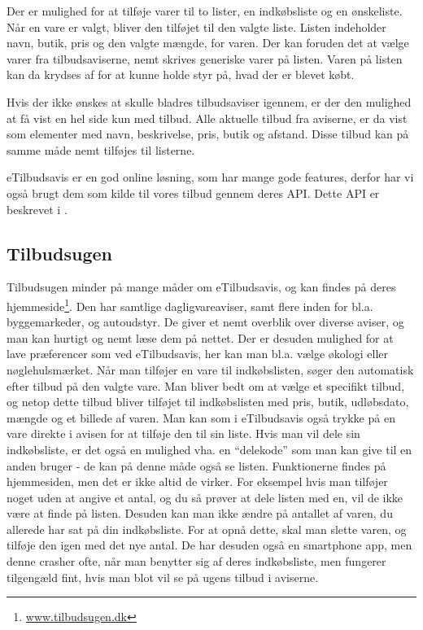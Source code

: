Der er mulighed for at tilføje varer til to lister, en indkøbsliste og en ønskeliste.
Når en vare er valgt, bliver den tilføjet til den valgte liste.
Listen indeholder navn, butik, pris og den valgte mængde, for varen.
Der kan foruden det at vælge varer fra tilbudsaviserne, nemt skrives generiske varer på listen. Varen på listen kan da krydses af for at kunne holde styr på, hvad der er blevet købt.

Hvis der ikke ønskes at skulle bladres tilbudsaviser igennem, er der den mulighed at få vist en hel side kun med tilbud.
Alle aktuelle tilbud fra aviserne, er da vist som elementer med navn, beskrivelse, pris, butik og afstand. Disse tilbud kan på samme måde nemt tilføjes til listerne.

eTilbudsavis er en god online løsning, som har mange gode features, derfor har vi også brugt dem som kilde til vores tilbud gennem deres API.
Dette API er beskrevet i . 

\subsection{Tilbudsugen}
Tilbudsugen minder på mange måder om eTilbudsavis, og kan findes på deres hjemmeside\footnote{\underline{www.tilbudsugen.dk}}.
Den har samtlige dagligvareaviser, samt flere inden for bl.a. byggemarkeder, og autoudstyr.
De giver et nemt overblik over diverse aviser, og man kan hurtigt og nemt læse dem på nettet.
Der er desuden mulighed for at lave præferencer som ved eTilbudsavis, her kan man bl.a. vælge økologi eller nøglehulsmærket.
Når man tilføjer en vare til indkøbslisten, søger den automatisk efter tilbud på den valgte vare.
Man bliver bedt om at vælge et specifikt tilbud, og netop dette tilbud bliver tilføjet til indkøbslisten med pris, butik, udløbsdato, mængde og et billede af varen.
Man kan som i eTilbudsavis også trykke på en vare direkte i avisen for at tilføje den til sin liste.
Hvis man vil dele sin indkøbsliste, er det også en mulighed vha. en ``delekode'' som man kan give til en anden bruger - de kan på denne måde også se listen.
Funktionerne findes på hjemmesiden, men det er ikke altid de virker.
For eksempel hvis man tilføjer noget uden at angive et antal, og du så prøver at dele listen med en, vil de ikke være at finde på listen.
Desuden kan man ikke ændre på antallet af varen, du allerede har sat på din indkøbsliste.
For at opnå dette, skal man slette varen, og tilføje den igen med det nye antal.
De har desuden også en smartphone app, men denne crasher ofte, når man benytter sig af deres indkøbsliste, men fungerer tilgengæld fint, hvis man blot vil se på ugens tilbud i aviserne.

